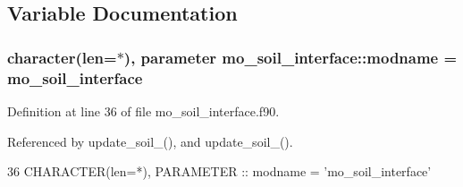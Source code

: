 \subsection{Variable Documentation}
\hypertarget{namespacemo__soil__interface_a77346ad1827157005a696fc3bcb7c014}{}
\subsubsection[{modname}]{\setlength{\rightskip}{0pt plus 5cm}character(len=$\ast$), parameter mo\+\_\+soil\+\_\+interface\+::modname = \textquotesingle{}mo\+\_\+soil\+\_\+interface\textquotesingle{}}\label{namespacemo__soil__interface_a77346ad1827157005a696fc3bcb7c014}


Definition at line 36 of file mo\+\_\+soil\+\_\+interface.\+f90.



Referenced by update\+\_\+soil\+\_(), and update\+\_\+soil\+\_().


\begin{DoxyCode}
36   \textcolor{keywordtype}{CHARACTER(len=*)}, \textcolor{keywordtype}{PARAMETER} :: modname = \textcolor{stringliteral}{'mo\_soil\_interface'}
\end{DoxyCode}
